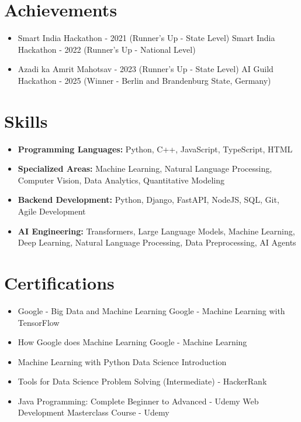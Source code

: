 \documentclass[a4paper,10pt]{article}
\begin{document}
\section*{Achievements}
\begin{itemize}
\item Smart India Hackathon - 2021 (Runner's Up - State Level) \hfill Smart India Hackathon - 2022 (Runner's Up - National Level)
\item Azadi ka Amrit Mahotsav - 2023 (Runner's Up - State Level) \hfill AI Guild Hackathon - 2025 (Winner - Berlin and Brandenburg State, Germany)
\end{itemize}

\section*{Skills}
\begin{itemize}
  \item \textbf{Programming Languages:} Python, C++, JavaScript, TypeScript, HTML
  \item \textbf{Specialized Areas:} Machine Learning, Natural Language Processing, Computer Vision, Data Analytics, Quantitative Modeling
  \item \textbf{Backend Development:} Python, Django, FastAPI, NodeJS, SQL, Git, Agile Development
  \item \textbf{AI Engineering:} Transformers, Large Language Models, Machine Learning, Deep Learning, Natural Language Processing, Data Preprocessing, AI Agents
\end{itemize}

\section*{Certifications}
\begin{itemize}
\item Google - Big Data and Machine Learning \hfill Google - Machine Learning with TensorFlow
\item How Google does Machine Learning \hfill Google - Machine Learning
\item Machine Learning with Python \hfill Data Science Introduction
\item Tools for Data Science \hfill Problem Solving (Intermediate) - HackerRank
\item Java Programming: Complete Beginner to Advanced - Udemy \hfill Web Development Masterclass Course - Udemy
\end{itemize}
\end{document}

